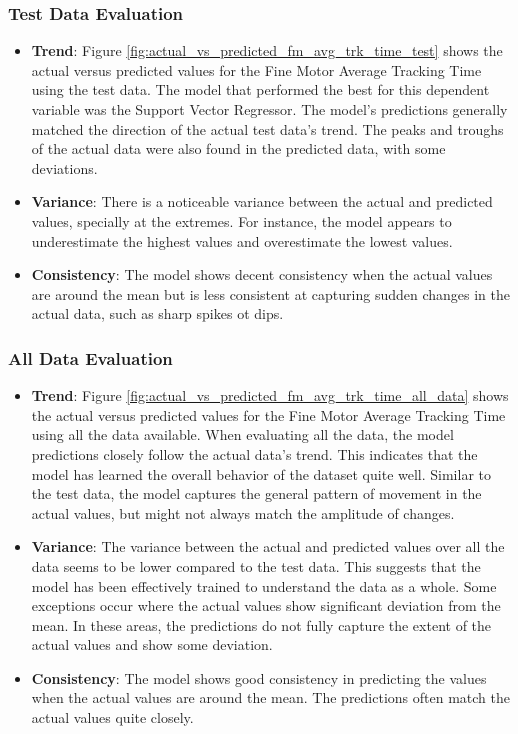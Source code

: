 \subsubsection*{Test Data Evaluation}

\begin{itemize}
    \item \textbf{Trend}: Figure \ref{fig:actual_vs_predicted_fm_avg_trk_time_test} shows the actual versus predicted values for the Fine Motor Average Tracking Time using the test data. The model that performed 
    the best for this dependent variable was the Support Vector Regressor. The model's predictions generally matched the direction of the actual test data's trend. The peaks and troughs of the
    actual data were also found in the predicted data, with some deviations. 
    \item \textbf{Variance}: There is a noticeable variance between the actual and predicted values, specially at the extremes. For instance, the model appears to underestimate the highest values
    and overestimate the lowest values.
    \item \textbf{Consistency}: The model shows decent consistency when the actual values are around the mean but is less consistent at capturing sudden changes in the actual data, such as sharp spikes ot dips.
\end{itemize}

\subsubsection*{All Data Evaluation}

\begin{itemize}
    \item \textbf{Trend}: Figure \ref{fig:actual_vs_predicted_fm_avg_trk_time_all_data} shows the actual versus predicted values for the Fine Motor Average Tracking Time using all the data
    available. When evaluating all the data, the model predictions closely follow the actual data's trend. This indicates that the model has learned the overall behavior of the dataset quite well.
    Similar to the test data, the model captures the general pattern of movement in the actual values, but might not always match the amplitude of changes.
    \item \textbf{Variance}: The variance between the actual and predicted values over all the data seems to be lower compared to the test data. This suggests that the model has been 
    effectively trained to understand the data as a whole. Some exceptions occur where the actual values show significant deviation from the mean. In these areas, the predictions do not fully 
    capture the extent of the actual values and show some deviation.
    \item \textbf{Consistency}: The model shows good consistency in predicting the values when the actual values are around the mean. The predictions often match the actual values quite closely.
\end{itemize}

